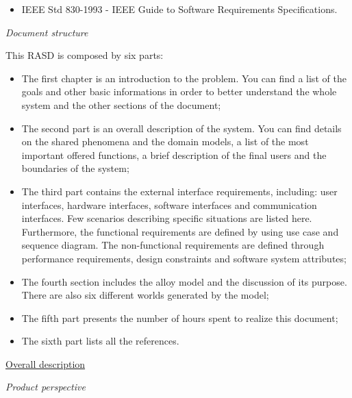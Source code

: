 \documentclass{article}
\begin{document}
\begin{legal}
\begin{legal}
{\begin{itemize}
			\item IEEE Std 830-1993 - IEEE Guide to Software Requirements Specifications.\\
			\end{itemize}
		}
		\item \textit{Document structure}\\
		{\normalfont
This RASD is composed by six parts:
		\begin{itemize}
		\item The first chapter is an introduction to the problem. You can find a list of the goals and other basic informations in order to better understand the whole system and the other sections of the document;\\
		\item The second part is an overall description of the system. You can find details on the shared phenomena and the domain models, a list of the most important offered functions, a brief description of the final users and the boundaries of the system;\\
		\item The third part contains the external interface requirements, including: user interfaces, hardware interfaces, software interfaces and communication interfaces. Few scenarios describing specific situations are listed here. Furthermore, the functional requirements are defined by using use case and sequence diagram. The non-functional requirements are defined through performance requirements, design constraints and software system attributes;\\
		\item The fourth section includes the alloy model and the discussion of its purpose. There are also six different worlds generated by the model;\\
		\item The fifth part presents the number of hours spent to realize this document;\\
		\item The sixth part lists all the references.\\
		\end{itemize}
		}		
		\end{legal}
		\newpage
  	\item \underline{Overall description}
  		\begin{legal}
    		\item \textit{Product perspective}\\\\
			{\normalfont \\
}
\end{legal}
\end{legal}
\end{document}
